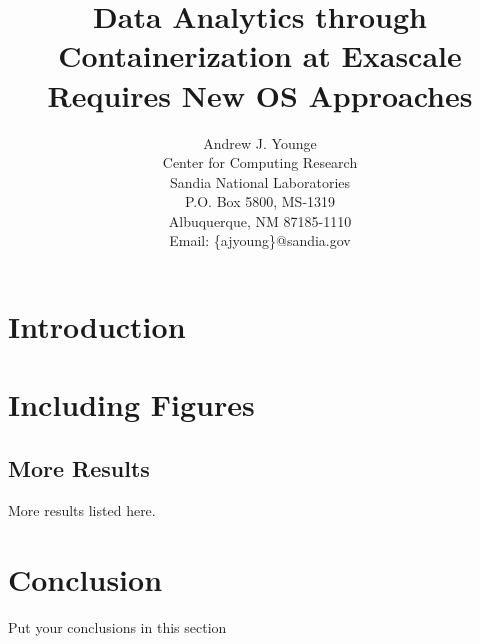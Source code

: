 
\newcommand{\AJY}[1]{{\color{red}\em  AJY: #1}}
\newcommand{\TODO}[1]{{\color{green}\em  TODO: #1}}
\newcommand{\E}[1]{{\color{red}~\blacksquare~\footnote{grammar, spelling, sentence, or other error}~}}

\newcommand{\AUTHOR}{%
Andrew J. Younge\\
Center for Computing Research \\
Sandia National Laboratories \\
P.O. Box 5800, MS-1319 \\
Albuquerque, NM 87185-1110 \\
Email: \{ajyoung\}@sandia.gov%
}
\newcommand{\TITLE}{Data Analytics through Containerization at Exascale Requires New OS Approaches}


\title{\TITLE}
\author{\AUTHOR}

\maketitle

\begin{abstract}


\end{abstract}

\section{Introduction}





\section{Including Figures}





\subsection{More Results}

More results listed here.
 

\section{Conclusion}

Put your conclusions in this section



